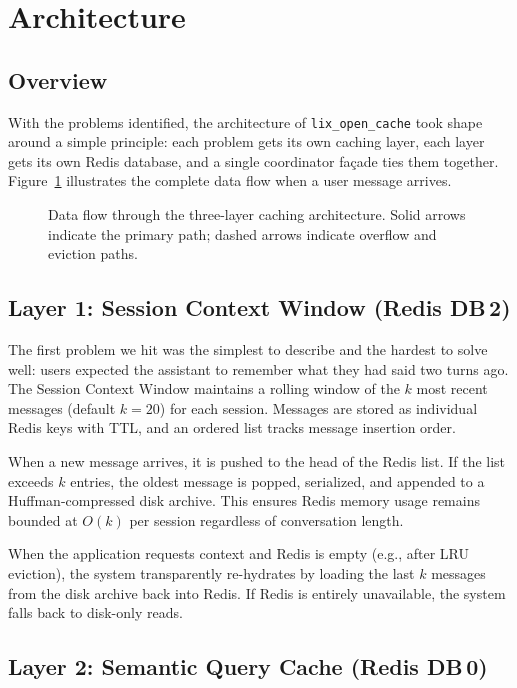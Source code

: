 \documentclass[conference]{IEEEtran}
\begin{document}
\section{Architecture}
\label{sec:architecture}

\subsection{Overview}

With the problems identified, the architecture of \texttt{lix\_open\_cache} took shape around a simple principle: each problem gets its own caching layer, each layer gets its own Redis database, and a single coordinator fa\c{c}ade ties them together. Figure~\ref{fig:architecture} illustrates the complete data flow when a user message arrives.

\begin{figure}[t]
\centering

\caption{Data flow through the three-layer caching architecture. Solid arrows indicate the primary path; dashed arrows indicate overflow and eviction paths.}
\label{fig:architecture}
\end{figure}

\subsection{Layer 1: Session Context Window (Redis DB\,2)}

The first problem we hit was the simplest to describe and the hardest to solve well: users expected the assistant to remember what they had said two turns ago. The Session Context Window maintains a rolling window of the $k$ most recent messages (default $k{=}20$) for each session. Messages are stored as individual Redis keys with TTL, and an ordered list tracks message insertion order.

When a new message arrives, it is pushed to the head of the Redis list. If the list exceeds $k$ entries, the oldest message is popped, serialized, and appended to a Huffman-compressed disk archive. This ensures Redis memory usage remains bounded at $O(k)$ per session regardless of conversation length.

When the application requests context and Redis is empty (e.g., after LRU eviction), the system transparently re-hydrates by loading the last $k$ messages from the disk archive back into Redis. If Redis is entirely unavailable, the system falls back to disk-only reads.

\subsection{Layer 2: Semantic Query Cache (Redis DB\,0)}
\end{document}
